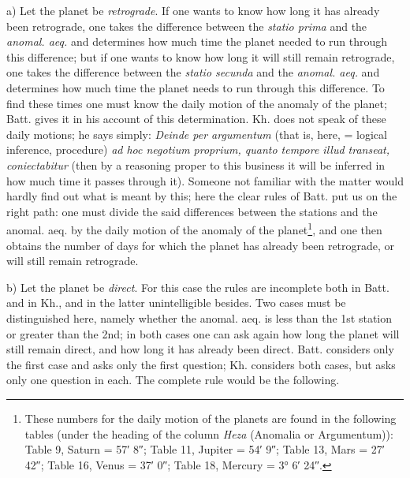 \documentclass[11pt]{article}
\begin{document}
\par a) Let the planet be \emph{retrograde}. If one wants to know how long it has already been retrograde, one takes the difference between the \emph{statio prima} and the \emph{anomal. aeq.} and determines how much time the planet needed to run through this difference; but if one wants to know how long it will still remain retrograde, one takes the difference between the \emph{statio secunda} and the \emph{anomal. aeq.} and determines how much time the planet needs to run through this difference. To find these times one must know the daily motion of the anomaly of the planet; Batt. gives it in his account of this determination. Kh. does not speak of these daily motions; he says simply: \emph{Deinde per argumentum} (that is, here, = logical inference, procedure) \emph{ad hoc negotium proprium, quanto tempore illud transeat, coniectabitur} (then by a reasoning proper to this business it will be inferred in how much time it passes through it). Someone not familiar with the matter would hardly find out what is meant by this; here the clear rules of Batt. put us on the right path: one must divide the said differences between the stations and the anomal. aeq. by the daily motion of the anomaly of the planet\footnote{These numbers for the daily motion of the planets are found in the following tables (under the heading of the column \emph{Heza} (Anomalia or Argumentum)): Table 9, Saturn = 57′ 8″; Table 11, Jupiter = 54′ 9″; Table 13, Mars = 27′ 42″; Table 16, Venus = 37′ 0″; Table 18, Mercury = 3° 6′ 24″.}, and one then obtains the number of days for which the planet has already been retrograde, or will still remain retrograde.\par
\par b) Let the planet be \emph{direct}. For this case the rules are incomplete both in Batt. and in Kh., and in the latter unintelligible besides. Two cases must be distinguished here, namely whether the anomal. aeq. is less than the 1st station or greater than the 2nd; in both cases one can ask again how long the planet will still remain direct, and how long it has already been direct. Batt. considers only the first case and asks only the first question; Kh. considers both cases, but asks only one question in each. The complete rule would be the following.\par
\end{document}
